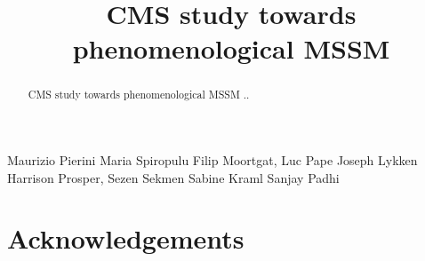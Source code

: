 \documentclass{cmspaper}
\begin{document}
%
\begin{titlepage}
\title{CMS study towards phenomenological MSSM}

  \begin{Authlist}
    Maurizio Pierini
    Maria Spiropulu
    Filip Moortgat, Luc Pape
    Joseph Lykken
    Harrison Prosper, Sezen Sekmen
    Sabine Kraml
    Sanjay Padhi
    
  \end{Authlist}

\begin{abstract}
CMS study towards phenomenological MSSM ..
\end{abstract}
\end{titlepage}

\section*{Acknowledgements}

\clearpage

%
%
\clearpage
\end{document}
